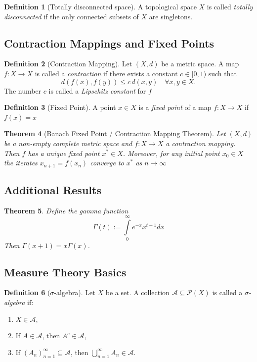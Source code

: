 \documentclass{article}
\theoremstyle{plain}
\newtheorem{thm}{Theorem}[section]
\theoremstyle{definition}
\newtheorem{defn}[thm]{Definition}
\theoremstyle{remark}
\begin{document}
\begin{defn}[Totally disconnected space]
A topological space $X$ is called \emph{totally disconnected} if the only connected subsets of $X$ are singletons. 
\end{defn}


\subsection*{Contraction Mappings and Fixed Points}
\begin{defn}[Contraction Mapping]
Let $(X,d)$ be a metric space. A map $f:X\to X$ is called a \emph{contraction} if there exists a constant $c\in[0,1)$ such that 
\[
d(f(x),f(y))\le c\,d(x,y)\quad\forall x,y\in X.
\] 
The number $c$ is called a \emph{Lipschitz constant} for $f$ 
\end{defn}

\begin{defn}[Fixed Point]
A point $x\in X$ is a \emph{fixed point} of a map $f:X\to X$ if $f(x)=x$
\end{defn}

\begin{thm}[Banach Fixed Point / Contraction Mapping Theorem]
Let $(X,d)$ be a non-empty complete metric space and $f:X\to X$ a contraction mapping. Then $f$ has a unique fixed point $x^* \in X$. Moreover, for any initial point $x_0\in X$ the iterates $x_{n+1}=f(x_n)$ converge to $x^*$ as $n\to\infty$ 
\end{thm}

\subsection*{Additional Results}
\begin{thm}\label{thm:gamma}
    Define the gamma function \[
    \Gamma (t):= \int \limits _0 ^\infty e^{-x}x^{t-1}dx
    \]
    Then $\Gamma (x+1) = x \Gamma (x)$.
\end{thm}

\subsection*{Measure Theory Basics}

\begin{defn}[$\sigma$-algebra]
Let $X$ be a set. A collection $\mathcal{A}\subseteq\mathcal{P}(X)$ is called a \emph{$\sigma$-algebra} if:
\begin{enumerate}
  \item $X\in\mathcal{A}$,
  \item If $A\in\mathcal{A}$, then $A^c\in\mathcal{A}$,
  \item If $(A_n)_{n=1}^\infty \subseteq \mathcal{A}$, then $\bigcup_{n=1}^\infty A_n \in \mathcal{A}$.
\end{enumerate}
\end{defn}
\end{document}

